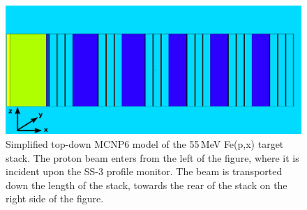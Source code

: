 \begin{figure}
 \centering
 \includegraphics[trim = 0mm 0mm 2mm 0mm, clip,width=0.75\columnwidth]{./figures/ipf_stack_nolabels_axes.PNG}
 \caption{Simplified top-down MCNP6 model of the 55\,MeV Fe(p,x) target stack. The  proton beam enters from the left of the figure, where it is incident upon the SS-3 profile monitor. The beam is transported down the length of the stack, towards the rear of the stack on the right side of the figure.
}
 \label{fig:fe_vised_55}
\end{figure}


